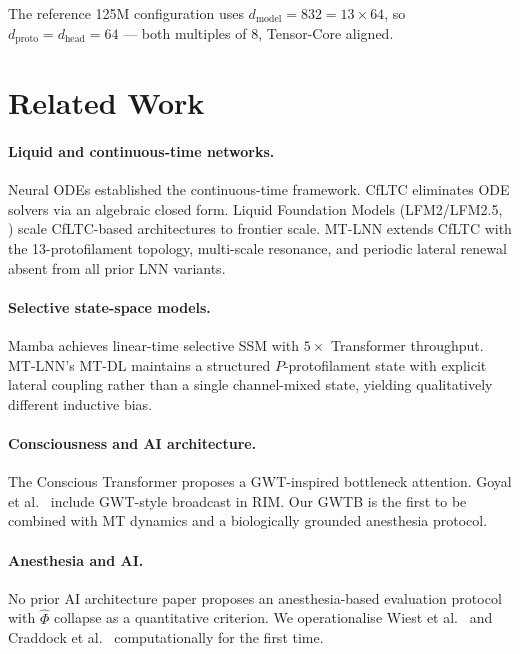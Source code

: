 \documentclass[11pt]{article}
\theoremstyle{definition}
\newcommand{\phihat}{\hat{\Phi}}
\begin{document}
The reference 125M configuration uses $d_\text{model}=832=13\times 64$, so $d_\text{proto}=d_\text{head}=64$ — both multiples of 8, Tensor-Core aligned.

\section{Related Work}
\label{sec:related}

\paragraph{Liquid and continuous-time networks.}
Neural ODEs \citep{chen2018neural} established the continuous-time framework. CfLTC \citep{hasani2022closed} eliminates ODE solvers via an algebraic closed form. Liquid Foundation Models (LFM2/LFM2.5, \citealt{liquid2025lfm}) scale CfLTC-based architectures to frontier scale. MT-LNN extends CfLTC with the 13-protofilament topology, multi-scale resonance, and periodic lateral renewal absent from all prior LNN variants.

\paragraph{Selective state-space models.}
Mamba \citep{gu2023mamba} achieves linear-time selective SSM with $5\times$ Transformer throughput. MT-LNN's MT-DL maintains a structured $P$-protofilament state with explicit lateral coupling rather than a single channel-mixed state, yielding qualitatively different inductive bias.

\paragraph{Consciousness and AI architecture.}
The Conscious Transformer \citep{vanrullen2021deep} proposes a GWT-inspired bottleneck attention. Goyal et al.\ \citep{goyal2021recurrent} include GWT-style broadcast in RIM. Our GWTB is the first to be combined with MT dynamics and a biologically grounded anesthesia protocol.

\paragraph{Anesthesia and AI.}
No prior AI architecture paper proposes an anesthesia-based evaluation protocol with $\phihat$ collapse as a quantitative criterion. We operationalise Wiest et al.\ \citep{wiest2025quantum} and Craddock et al.\ \citep{craddock2017anesthetic} computationally for the first time.
\end{document}
